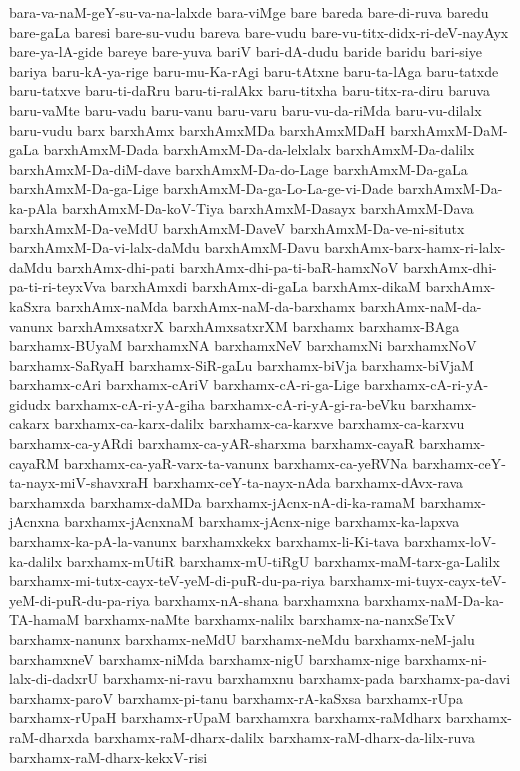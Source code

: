 {bara-va-naM-geY-su-va-na-lalxde
bara-viMge
bare
bareda
bare-di-ruva
baredu
bare-gaLa
baresi
bare-su-vudu
bareva
bare-vudu
bare-vu-titx-didx-ri-deV-nayAyx
bare-ya-lA-gide
bareye
bare-yuva
bariV
bari-dA-dudu
baride
baridu
bari-siye
bariya
baru-kA-ya-rige
baru-mu-Ka-rAgi
baru-tAtxne
baru-ta-lAga
baru-tatxde
baru-tatxve
baru-ti-daRru
baru-ti-ralAkx
baru-titxha
baru-titx-ra-diru
baruva
baru-vaMte
baru-vadu
baru-vanu
baru-varu
baru-vu-da-riMda
baru-vu-dilalx
baru-vudu
barx
barxhAmx
barxhAmxMDa
barxhAmxMDaH
barxhAmxM-DaM-gaLa
barxhAmxM-Dada
barxhAmxM-Da-da-lelxlalx
barxhAmxM-Da-dalilx
barxhAmxM-Da-diM-dave
barxhAmxM-Da-do-Lage
barxhAmxM-Da-gaLa
barxhAmxM-Da-ga-Lige
barxhAmxM-Da-ga-Lo-La-ge-vi-Dade
barxhAmxM-Da-ka-pAla
barxhAmxM-Da-koV-Tiya
barxhAmxM-Dasayx
barxhAmxM-Dava
barxhAmxM-Da-veMdU
barxhAmxM-DaveV
barxhAmxM-Da-ve-ni-situtx
barxhAmxM-Da-vi-lalx-daMdu
barxhAmxM-Davu
barxhAmx-barx-hamx-ri-lalx-daMdu
barxhAmx-dhi-pati
barxhAmx-dhi-pa-ti-baR-hamxNoV
barxhAmx-dhi-pa-ti-ri-teyxVva
barxhAmxdi
barxhAmx-di-gaLa
barxhAmx-dikaM
barxhAmx-kaSxra
barxhAmx-naMda
barxhAmx-naM-da-barxhamx
barxhAmx-naM-da-vanunx
barxhAmxsatxrX
barxhAmxsatxrXM
barxhamx
barxhamx-BAga
barxhamx-BUyaM
barxhamxNA
barxhamxNeV
barxhamxNi
barxhamxNoV
barxhamx-SaRyaH
barxhamx-SiR-gaLu
barxhamx-biVja
barxhamx-biVjaM
barxhamx-cAri
barxhamx-cAriV
barxhamx-cA-ri-ga-Lige
barxhamx-cA-ri-yA-gidudx
barxhamx-cA-ri-yA-giha
barxhamx-cA-ri-yA-gi-ra-beVku
barxhamx-cakarx
barxhamx-ca-karx-dalilx
barxhamx-ca-karxve
barxhamx-ca-karxvu
barxhamx-ca-yARdi
barxhamx-ca-yAR-sharxma
barxhamx-cayaR
barxhamx-cayaRM
barxhamx-ca-yaR-varx-ta-vanunx
barxhamx-ca-yeRVNa
barxhamx-ceY-ta-nayx-miV-shavxraH
barxhamx-ceY-ta-nayx-nAda
barxhamx-dAvx-rava
barxhamxda
barxhamx-daMDa
barxhamx-jAcnx-nA-di-ka-ramaM
barxhamx-jAcnxna
barxhamx-jAcnxnaM
barxhamx-jAcnx-nige
barxhamx-ka-lapxva
barxhamx-ka-pA-la-vanunx
barxhamxkekx
barxhamx-li-Ki-tava
barxhamx-loV-ka-dalilx
barxhamx-mUtiR
barxhamx-mU-tiRgU
barxhamx-maM-tarx-ga-Lalilx
barxhamx-mi-tutx-cayx-teV-yeM-di-puR-du-pa-riya
barxhamx-mi-tuyx-cayx-teV-yeM-di-puR-du-pa-riya
barxhamx-nA-shana
barxhamxna
barxhamx-naM-Da-ka-TA-hamaM
barxhamx-naMte
barxhamx-nalilx
barxhamx-na-nanxSeTxV
barxhamx-nanunx
barxhamx-neMdU
barxhamx-neMdu
barxhamx-neM-jalu
barxhamxneV
barxhamx-niMda
barxhamx-nigU
barxhamx-nige
barxhamx-ni-lalx-di-dadxrU
barxhamx-ni-ravu
barxhamxnu
barxhamx-pada
barxhamx-pa-davi
barxhamx-paroV
barxhamx-pi-tanu
barxhamx-rA-kaSxsa
barxhamx-rUpa
barxhamx-rUpaH
barxhamx-rUpaM
barxhamxra
barxhamx-raMdharx
barxhamx-raM-dharxda
barxhamx-raM-dharx-dalilx
barxhamx-raM-dharx-da-lilx-ruva
barxhamx-raM-dharx-kekxV-risi
}
